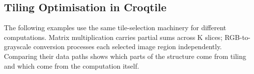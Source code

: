 \subsection*{Tiling Optimisation in Croqtile}

The following examples use the same tile-selection machinery for different computations. Matrix multiplication carries partial sums across K slices; RGB-to-grayscale conversion processes each selected image region independently. Comparing their data paths shows which parts of the structure come from tiling and which come from the computation itself.
